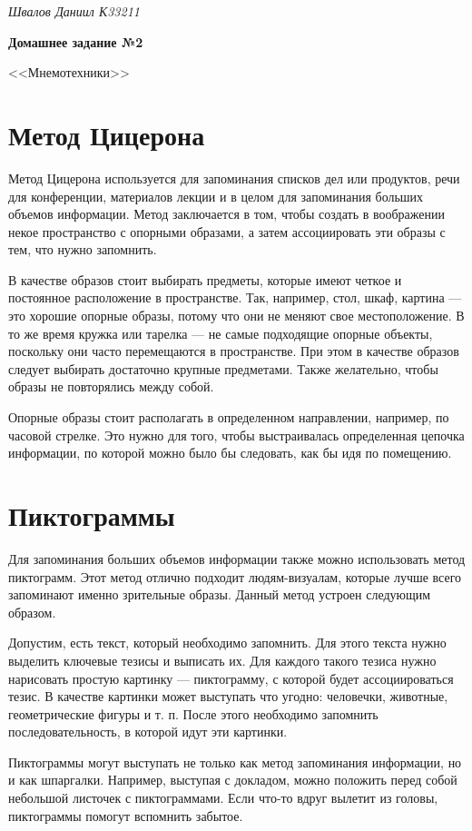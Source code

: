 \documentclass[a4paper, 14pt]{extarticle}
\begin{document}
\begin{flushright}
  \textit{Швалов Даниил К33211}
\end{flushright}

\begin{center}
  \bfseries
  Домашнее задание №2

  <<Мнемотехники>>
\end{center}

\section*{Метод Цицерона}

Метод Цицерона используется для запоминания списков дел или продуктов, речи для
конференции, материалов лекции и в целом для запоминания больших объемов
информации. Метод заключается в том, чтобы создать в воображении некое
пространство с опорными образами, а затем ассоциировать эти образы с тем, что
нужно запомнить.

В качестве образов стоит выбирать предметы, которые имеют четкое и постоянное
расположение в пространстве. Так, например, стол, шкаф, картина --- это хорошие
опорные образы, потому что они не меняют свое местоположение. В то же время
кружка или тарелка --- не самые подходящие опорные объекты, поскольку они часто
перемещаются в пространстве. При этом в качестве образов следует выбирать
достаточно крупные предметами. Также желательно, чтобы образы не повторялись
между собой.

Опорные образы стоит располагать в определенном направлении, например, по
часовой стрелке. Это нужно для того, чтобы выстраивалась определенная цепочка
информации, по которой можно было бы следовать, как бы идя по помещению.

\section*{Пиктограммы}

Для запоминания больших объемов информации также можно использовать метод
пиктограмм. Этот метод отлично подходит людям-визуалам, которые лучше всего
запоминают именно зрительные образы. Данный метод устроен следующим образом.

Допустим, есть текст, который необходимо запомнить. Для этого текста нужно
выделить ключевые тезисы и выписать их. Для каждого такого тезиса нужно
нарисовать простую картинку --- пиктограмму, с которой будет ассоциироваться
тезис. В качестве картинки может выступать что угодно: человечки, животные,
геометрические фигуры и т. п. После этого необходимо запомнить
последовательность, в которой идут эти картинки.

Пиктограммы могут выступать не только как метод запоминания информации, но и как
шпаргалки. Например, выступая с докладом, можно положить перед собой небольшой
листочек с пиктограммами. Если что-то вдруг вылетит из головы, пиктограммы
помогут вспомнить забытое.
\end{document}
